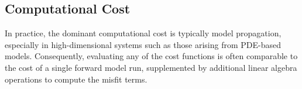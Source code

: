 \documentclass[final,1p,times]{elsarticle}
\begin{document}
\subsection{Computational Cost}\label{subsec:comp_cost}
In practice, the dominant computational cost is typically model propagation, especially in high-dimensional systems such as those arising from PDE-based models. 
Consequently, evaluating any of the cost functions is often comparable to the cost of a single forward model run, supplemented by additional linear algebra operations to compute the misfit terms.
\end{document}
